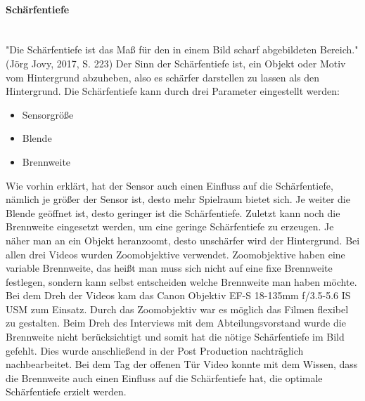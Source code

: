 \paragraph{Schärfentiefe}
\leavevmode \\
"Die Schärfentiefe ist das Maß für den in einem Bild scharf abgebildeten Bereich." (Jörg Jovy, 2017, S. 223)\newline
Der Sinn der Schärfentiefe ist, ein Objekt oder Motiv vom Hintergrund abzuheben, also es schärfer darstellen zu lassen als den Hintergrund.\citep{scharf}\newline
Die Schärfentiefe kann durch drei Parameter eingestellt werden:
\begin{itemize}
	\item Sensorgröße
	\item Blende
	\item Brennweite
\end{itemize}
Wie vorhin erklärt, hat der Sensor auch einen Einfluss auf die Schärfentiefe, nämlich je größer der Sensor ist, desto mehr Spielraum bietet sich.\newline
Je weiter die Blende geöffnet ist, desto geringer ist die Schärfentiefe. Zuletzt kann noch die Brennweite eingesetzt werden, um eine geringe Schärfentiefe zu erzeugen. Je näher man an ein Objekt heranzoomt, desto unschärfer wird der Hintergrund.\citep{scharfZwei}\newline 
Bei allen drei Videos wurden Zoomobjektive verwendet. Zoomobjektive haben eine variable Brennweite, das heißt man muss sich nicht auf eine fixe Brennweite festlegen, sondern kann selbst entscheiden welche Brennweite man haben möchte. Bei dem Dreh der Videos kam das Canon Objektiv EF-S 18-135mm f/3.5-5.6 IS USM zum Einsatz. Durch das Zoomobjektiv war es möglich das Filmen flexibel zu gestalten.\newline
Beim Dreh des Interviews mit dem Abteilungsvorstand wurde die Brennweite nicht berücksichtigt und somit hat die nötige Schärfentiefe im Bild gefehlt. Dies wurde anschließend in der Post Production nachträglich nachbearbeitet. Bei dem Tag der offenen Tür Video konnte mit dem Wissen, dass die Brennweite auch einen Einfluss auf die Schärfentiefe hat, die optimale Schärfentiefe erzielt werden.